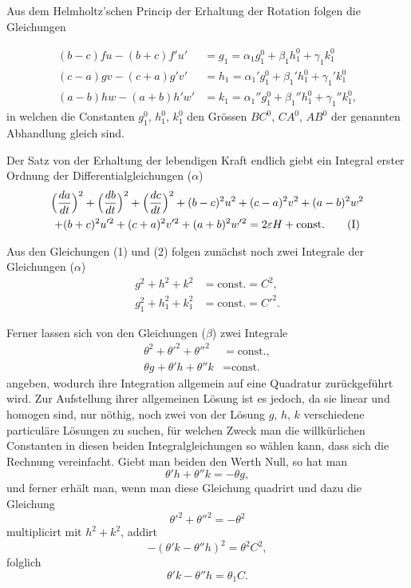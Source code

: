 \documentclass[12pt,a4paper]{article}
\begin{document}
Aus dem Helmholtz'schen Princip der Erhaltung der Rotation folgen die Gleichungen

\begin{align*}
(b - c)fu - (b + c)f'u' &= g_{1} = \alpha_{1} g_{1}^{0} + \beta_{1} h_{1}^{0} + \gamma_{1} k_{1}^{0}\\
(c - a)gv - (c + a)g'v' &= h_{1} = \alpha_{1}' g_{1}^{0} + \beta_{1}' h_{1}^{0} + \gamma_{1}' k_{1}^{0}\\
(a - b)hw - (a + b)h'w' &= k_{1} = \alpha_{1}'' g_{1}^{0} + \beta_{1}'' h_{1}^{0} + \gamma_{1}'' k_{1}^{0},\tag{2}
\end{align*}
in welchen die Constanten $g_{1}^{0}$, $h_{1}^{0}$, $k_{1}^{0}$ den Gr\"ossen $BC^{0}$, $CA^{0}$, $AB^{0}$ der genannten Abhandlung gleich sind.

Der Satz von der Erhaltung der lebendigen Kraft endlich giebt ein Integral erster Ordnung der Differentialgleichungen ($\alpha$)
\begin{multline*}
\Bigl(\frac{da}{dt}\Bigr)^{2} + \Bigl(\frac{db}{dt}\Bigr)^{2} + \Bigl(\frac{dc}{dt}\Bigr)^{2} + (b - c)^{2}u^{2} + (c - a)^{2}v^{2} + (a - b)^{2}w^{2}\\
+ (b + c)^{2}u'^{2} + (c + a)^{2}v'^{2} + (a + b)^{2}w'^{2} = 2\varepsilon H + \text{const.}\tag{I}
\end{multline*}

Aus den Gleichungen (1) und (2) folgen zun\"achst noch zwei Integrale der Gleichungen ($\alpha$)
\begin{align*}
g^{2} + h^{2} + k^{2} &= \text{const.} = C^{2},\tag{II}\\
g_{1}^{2} + h_{1}^{2} + k_{1}^{2} &= \text{const.} = C'^{2}.\tag{III}
\end{align*}

Ferner lassen sich von den Gleichungen ($\beta$) zwei Integrale
\begin{align*}
\theta^{2} + \theta'^{2} + \theta''^{2} &= \text{const.},\tag{IV}\\
\theta g + \theta' h + \theta'' k &= \text{const.}\tag{V}
\end{align*}
angeben, wodurch ihre Integration allgemein auf eine Quadratur zur\"uckgef\"uhrt wird. Zur Aufstellung ihrer allgemeinen L\"osung ist es jedoch, da sie linear und homogen sind, nur n\"othig, noch zwei von der L\"osung $g$, $h$, $k$ verschiedene particul\"are L\"osungen zu suchen, f\"ur welchen Zweck man die willk\"urlichen Constanten in diesen beiden Integralgleichungen so w\"ahlen kann, dass sich die Rechnung vereinfacht. Giebt man beiden den Werth Null, so hat man
\begin{equation*}
\theta' h + \theta'' k = -\theta g,\tag{3}
\end{equation*}
und ferner erh\"alt man, wenn man diese Gleichung quadrirt und dazu die Gleichung
\[
\theta'^{2} + \theta''^{2} = -\theta^{2}
\]
multiplicirt mit $h^{2} + k^{2}$, addirt
\[
-(\theta' k - \theta'' h)^{2} = \theta^{2}C^{2},
\]
folglich
\begin{equation*}
\theta' k - \theta'' h = \theta_{1} C.\tag{4}
\end{equation*}
\end{document}
